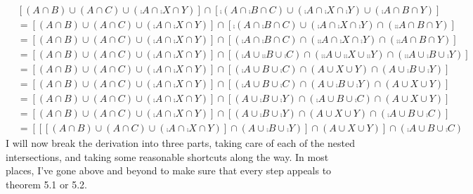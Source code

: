 \documentclass[12pt]{book}
\begin{document}
\begin{enumerate}
\begin{enumerate}
{\begin{align*}&[(A \cap B) \cup (A \cap C) \cup (\comp{A} \cap \comp{X} \cap Y)] \cap [\comp{(A \cap \comp{B} \cap C) \cup (\comp{A} \cap \comp{X} \cap \comp{Y}) \cup (\comp{A} \cap B \cap Y)}] \\&= [(A \cap B) \cup (A \cap C) \cup (\comp{A} \cap \comp{X} \cap Y)] \cap [\comp{(A \cap \comp{B} \cap C) \cup (\comp{A} \cap \comp{X} \cap \comp{Y})} \cap (\comp{\comp{A} \cap B \cap Y})]\tag{5.2.13}\\&= [(A \cap B) \cup (A \cap C) \cup (\comp{A} \cap \comp{X} \cap Y)] \cap [(\comp{A \cap \comp{B} \cap C}) \cap (\comp{\comp{A} \cap \comp{X} \cap \comp{Y}}) \cap (\comp{\comp{A} \cap B \cap Y})] \tag{5.2.13}\\&= [(A \cap B) \cup (A \cap C) \cup (\comp{A} \cap \comp{X} \cap Y)] \cap [(\comp{A} \cup \comp{\comp{B}} \cup \comp{C}) \cap (\comp{\comp{A}} \cup \comp{\comp{X}} \cup \comp{\comp{Y}}) \cap (\comp{\comp{A}} \cup \comp{B} \cup \comp{Y})]\tag{5.2.13'}\\&= [(A \cap B) \cup (A \cap C) \cup (\comp{A} \cap \comp{X} \cap Y)] \cap [(\comp{A} \cup B \cup \comp{C}) \cap (A \cup X \cup Y) \cap (A \cup \comp{B} \cup \comp{Y})]\tag{5.2.8}\\&= [(A \cap B) \cup (A \cap C) \cup (\comp{A} \cap \comp{X} \cap Y)] \cap [(\comp{A} \cup B \cup \comp{C}) \cap (A \cup \comp{B} \cup \comp{Y}) \cap (A \cup X \cup Y)]\tag{5.1.2'}\\&= [(A \cap B) \cup (A \cap C) \cup (\comp{A} \cap \comp{X} \cap Y)] \cap [(A \cup \comp{B} \cup \comp{Y}) \cap (\comp{A} \cup B \cup \comp{C}) \cap (A \cup X \cup Y)]\tag{5.1.2'}\\&= [(A \cap B) \cup (A \cap C) \cup (\comp{A} \cap \comp{X} \cap Y)] \cap [(A \cup \comp{B} \cup \comp{Y})  \cap (A \cup X \cup Y) \cap (\comp{A} \cup B \cup \comp{C})]\tag{5.1.2'}\\&= [[[(A \cap B) \cup (A \cap C) \cup (\comp{A} \cap \comp{X} \cap Y)] \cap (A \cup \comp{B} \cup \comp{Y})] \cap (A \cup X \cup Y)] \cap (\comp{A} \cup B \cup \comp{C})\tag{5.1.1'}\end{align*}
I will now break the derivation into three parts, taking care of each of the nested intersections, and taking some reasonable shortcuts along the way. In most places, I've gone above and beyond to make sure that every step appeals to theorem 5.1 or 5.2.\pagebreak
}
\end{enumerate}
\end{enumerate}
\end{document}
